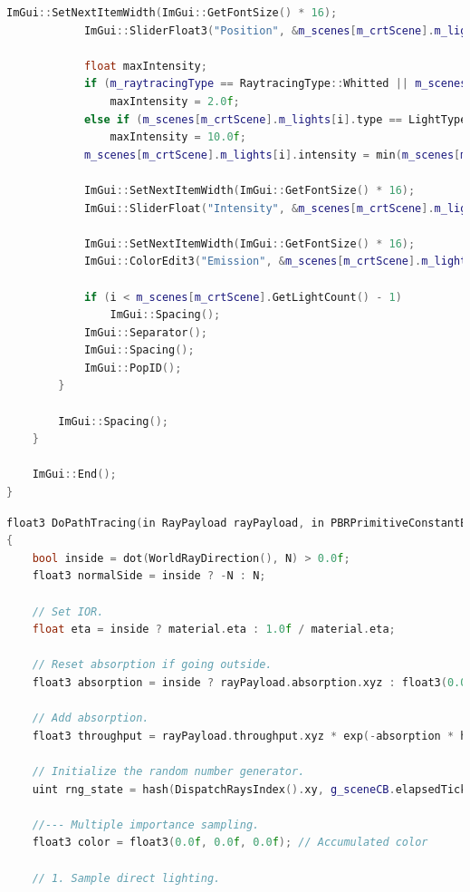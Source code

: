 \documentclass[12pt,a4paper]{report}
\numberwithin{equation}{section} %
\begin{document}
\begin{appendices}
\begin{lstlisting}[caption={Compunerea meniului ImGui},label={lst:showui},language=C++]
			ImGui::SetNextItemWidth(ImGui::GetFontSize() * 16);
			ImGui::SliderFloat3("Position", &m_scenes[m_crtScene].m_lights[i].position.x, -20.0f, 20.0f);

			float maxIntensity;
			if (m_raytracingType == RaytracingType::Whitted || m_scenes[m_crtScene].m_lights[i].type == LightType::Directional)
				maxIntensity = 2.0f;
			else if (m_scenes[m_crtScene].m_lights[i].type == LightType::Square)
				maxIntensity = 10.0f;
			m_scenes[m_crtScene].m_lights[i].intensity = min(m_scenes[m_crtScene].m_lights[i].intensity, maxIntensity);

			ImGui::SetNextItemWidth(ImGui::GetFontSize() * 16);
			ImGui::SliderFloat("Intensity", &m_scenes[m_crtScene].m_lights[i].intensity, 0.0f, maxIntensity);

			ImGui::SetNextItemWidth(ImGui::GetFontSize() * 16);
			ImGui::ColorEdit3("Emission", &m_scenes[m_crtScene].m_lights[i].emission.x);

			if (i < m_scenes[m_crtScene].GetLightCount() - 1)
				ImGui::Spacing();
			ImGui::Separator();
			ImGui::Spacing();
			ImGui::PopID();
		}

		ImGui::Spacing();
	}

	ImGui::End();
}
\end{lstlisting}
	\begin{lstlisting}[caption={Algoritmul Path Tracing},label={lst:pathtracing},language=C++,escapechar=\$]
float3 DoPathTracing(in RayPayload rayPayload, in PBRPrimitiveConstantBuffer material, in float3 N, in float3 hitPosition, in float hitDistance)
{
	bool inside = dot(WorldRayDirection(), N) > 0.0f;
	float3 normalSide = inside ? -N : N;

	// Set IOR.
	float eta = inside ? material.eta : 1.0f / material.eta;

	// Reset absorption if going outside.
	float3 absorption = inside ? rayPayload.absorption.xyz : float3(0.0f, 0.0f, 0.0f);	$\label{line:absorption1}$

	// Add absorption.
	float3 throughput = rayPayload.throughput.xyz * exp(-absorption * hitDistance);		$\label{line:absorption2}$

	// Initialize the random number generator.
	uint rng_state = hash(DispatchRaysIndex().xy, g_sceneCB.elapsedTicks + rayPayload.recursionDepth * 1337 + hash(hitPosition));

	//--- Multiple importance sampling.
	float3 color = float3(0.0f, 0.0f, 0.0f); // Accumulated color

	// 1. Sample direct lighting.


\end{lstlisting}
\end{appendices}
\end{document}
